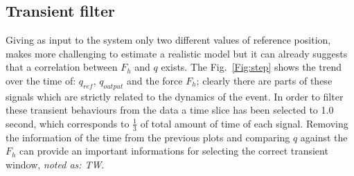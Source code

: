 \subsection{Transient filter}\label{sec:transientStep}
Giving as input to the system only two different values of reference position, makes more challenging to estimate a realistic model but it can already suggests that a correlation between $F_{h}$ and $q$ exists.
The Fig.~\ref{Fig:step} shows the trend over the time of: $q_{ref}$, $q_{output}$ and the force $F_{h}$; clearly there are parts of these signals which are strictly related to the dynamics of the event. 
In order to filter these transient behaviours from the data a time slice has been selected to 1.0 second, which corresponds to $\frac{1}{3}$ of total amount of time of each signal.
Removing the information of the time from the previous plots and comparing $q$ against the $F_{h}$ can provide an important informations for selecting the correct transient window, \textit{noted as: TW}. \\

